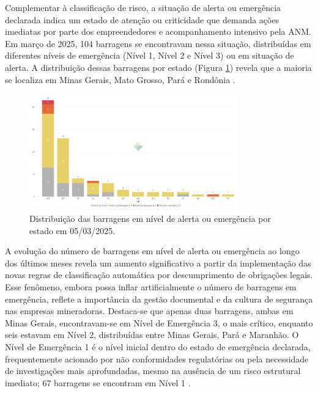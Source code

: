 Complementar à classificação de risco, a situação de alerta ou emergência declarada indica um estado de atenção ou criticidade que demanda ações imediatas por parte dos empreendedores e acompanhamento intensivo pela ANM. Em março de 2025, 104 barragens se encontravam nessa situação, distribuídas em diferentes níveis de emergência (Nível 1, Nível 2 e Nível 3) ou em situação de alerta. A distribuição dessas barragens por estado (Figura \ref{fig:distribuicao_alerta}) revela que a maioria se localiza em Minas Gerais, Mato Grosso, Pará e Rondônia \cite{anm2025boletim}.

\begin{figure}[htbp]
    \centering
    \includegraphics[width=0.8\textwidth]{figures/image32_distribuicao_barragens_nivel_alerta.png}
    \caption{Distribuição das barragens em nível de alerta ou emergência por estado em 05/03/2025.}
    \label{fig:distribuicao_alerta}
\end{figure}

A evolução do número de barragens em nível de alerta ou emergência ao longo dos últimos meses revela um aumento significativo a partir da implementação das novas regras de classificação automática por descumprimento de obrigações legais. Esse fenômeno, embora possa inflar artificialmente o número de barragens em emergência, reflete a importância da gestão documental e da cultura de segurança nas empresas mineradoras. Destaca-se que apenas duas barragens, ambas em Minas Gerais, encontravam-se em Nível de Emergência 3, o mais crítico, enquanto seis estavam em Nível 2, distribuídas entre Minas Gerais, Pará e Maranhão. O Nível de Emergência 1 é o nível inicial dentro do estado de emergência declarada, frequentemente acionado por não conformidades regulatórias ou pela necessidade de investigações mais aprofundadas, mesmo na ausência de um risco estrutural imediato; 67 barragens se encontram em Nível 1 \cite{anm2025boletim}.

